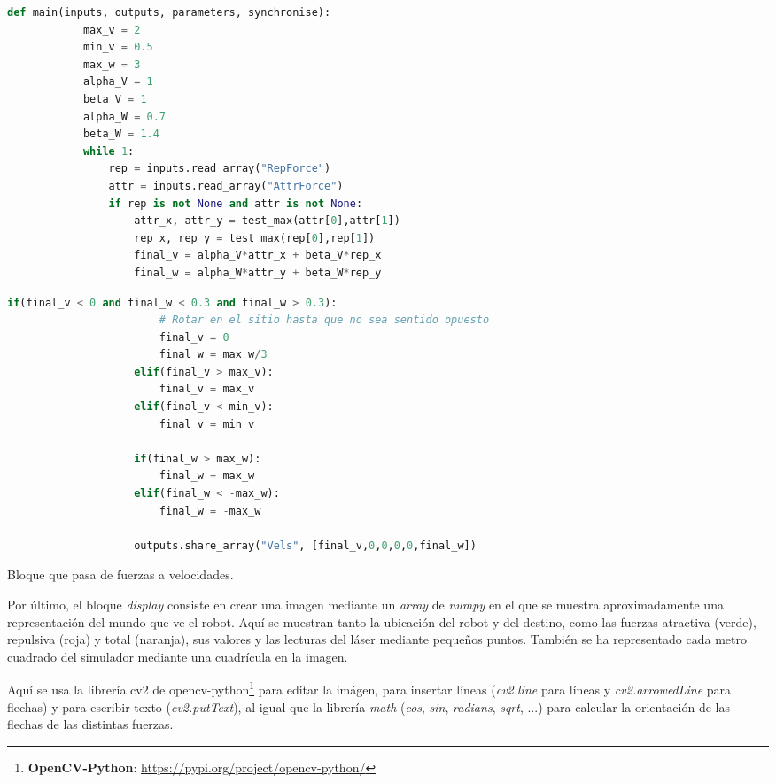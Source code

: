 \begin{code}[H]
    \begin{lstlisting}[language=python]
        def main(inputs, outputs, parameters, synchronise):
            max_v = 2
            min_v = 0.5
            max_w = 3
            alpha_V = 1
            beta_V = 1
            alpha_W = 0.7
            beta_W = 1.4
            while 1:
                rep = inputs.read_array("RepForce")
                attr = inputs.read_array("AttrForce")
                if rep is not None and attr is not None:
                    attr_x, attr_y = test_max(attr[0],attr[1])
                    rep_x, rep_y = test_max(rep[0],rep[1])
                    final_v = alpha_V*attr_x + beta_V*rep_x
                    final_w = alpha_W*attr_y + beta_W*rep_y
    \end{lstlisting}
\end{code}
\begin{code}[H]
    \begin{lstlisting}[language=python]
                    if(final_v < 0 and final_w < 0.3 and final_w > 0.3):
                        # Rotar en el sitio hasta que no sea sentido opuesto
                        final_v = 0
                        final_w = max_w/3
                    elif(final_v > max_v):
                        final_v = max_v
                    elif(final_v < min_v):
                        final_v = min_v

                    if(final_w > max_w):
                        final_w = max_w
                    elif(final_w < -max_w):
                        final_w = -max_w

                    outputs.share_array("Vels", [final_v,0,0,0,0,final_w])
    \end{lstlisting}
    \caption[Bloque forces to vels]{Bloque que pasa de fuerzas a velocidades.}
    \label{cod:FSM_forcestovels}
\end{code}

Por último, el bloque \textit{display} consiste en crear una imagen mediante un \textit{array} de \textit{numpy} en el que se muestra aproximadamente una representación del
mundo que ve el robot. Aquí se muestran tanto la ubicación del robot y del destino, como las fuerzas atractiva (verde), repulsiva (roja) y total (naranja), sus valores y las lecturas
del láser mediante pequeños puntos. También se ha representado cada metro cuadrado del simulador mediante una cuadrícula en la imagen.

Aquí se usa la librería cv2 de opencv-python\footnote{\textbf{OpenCV-Python}: \url{https://pypi.org/project/opencv-python/}} para editar la imágen, para insertar
líneas (\textit{cv2.line} para líneas y \textit{cv2.arrowedLine} para flechas) y para escribir texto (\textit{cv2.putText}), al igual que la librería \textit{math}
(\textit{cos}, \textit{sin}, \textit{radians}, \textit{sqrt}, ...) para calcular la orientación de las flechas de las distintas fuerzas.


